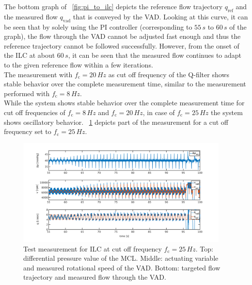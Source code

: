 The bottom graph of \figurename~\ref{fig:pi_to_ilc} depicts the reference flow trajectory $q_{\mathrm{ref}}$ and the measured flow $q_{\mathrm{vad}}$ that is conveyed by the VAD. Looking at this curve, it can be seen that by solely using the PI controller (corresponding to $55\,s$ to $60\,s$ of the graph), the flow through the VAD cannot be adjusted fast enough and thus the reference trajectory cannot be followed successfully. However, from the onset of the ILC at about $60\,s$, it can be seen that the measured flow continues to adapt to the given reference flow within a few iterations.
\\The measurement with $f_{\mathrm{c}}=20\,Hz$ as cut off frequency of the Q-filter shows stable behavior over the complete measurement time, similar to the measurement performed with $f_{\mathrm{c}}=8\,Hz$.
\\While the system shows stable behavior over the complete measurement time for cut off frequencies of $f_{\mathrm{c}}=8\,Hz$ and $f_{\mathrm{c}}=20\,Hz$, in case of $f_{\mathrm{c}}=25\,Hz$ the system shows oscillatory behavior. \figurename~\ref{fig:pi_to_ilc_fc_25} depicts part of the measurement for a cut off frequency set to $f_{\mathrm{c}}=25\,Hz$.
\begin{figure}[ht]
  \centering
  \includegraphics[width=0.95\textwidth]{images/chapt_5/ILC/pi_to_ilc_fc_25.pdf}
  \caption[Test measurement for ILC at cut off frequency $f_{\mathrm{c}}=25\,Hz$]{Test measurement for ILC at cut off frequency $f_{\mathrm{c}}=25\,Hz$. Top: differential pressure value of the MCL. Middle: actuating variable and measured rotational speed of the VAD. Bottom: targeted flow trajectory and measured flow through the VAD.}
  \label{fig:pi_to_ilc_fc_25}
\end{figure}
